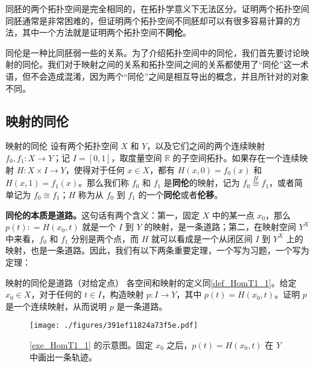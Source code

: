 
同胚的两个拓扑空间是完全相同的，在拓扑学意义下无法区分。证明两个拓扑空间同胚通常是非常困难的，但证明两个拓扑空间不同胚却可以有很多容易计算的方法，其中一个方法就是证明两个拓扑空间不\textbf{同伦}。

同伦是一种比同胚弱一些的关系。为了介绍拓扑空间中的同伦，我们首先要讨论映射的同伦。我们对于映射之间的关系和拓扑空间之间的关系都使用了“同伦”这一术语，但不会造成混淆，因为两个“同伦”之间是相互导出的概念，并且所针对的对象不同。

\subsection{映射的同伦}

\begin{definition}{映射的同伦}\label{def_HomT1_1}
设有两个拓扑空间 $X$ 和 $Y$，以及它们之间的两个连续映射 $f_0, f_1:X\rightarrow Y$；记 $I=[0, 1]$，取度量空间 $\mathbb{R}$ 的子空间拓扑。如果存在一个连续映射 $H: X\times I\rightarrow Y$，使得对于任何 $x\in X$，都有 $H(x, 0)=f_0(x)$ 和 $H(x, 1)=f_1(x)$。那么我们称 $f_0$ 和 $f_1$ 是\textbf{同伦}的映射，记为 $f_0\overset{H}{\cong} f_1$，或者简单记为 $f_0\cong f_1$；$H$ 称为从 $f_0$ 到 $f_1$ 的一个\textbf{同伦}或者\textbf{伦移}。

\end{definition}

\textbf{同伦的本质是道路。}这句话有两个含义：第一，固定 $X$ 中的某一点 $x_0$，那么 $p(t): = H(x_0, t)$ 就是一个 $I$ 到 $Y$ 的映射，是一条道路；第二，在映射空间 $Y^X$ 中来看，$f_0$ 和 $f_1$ 分别是两个点，而 $H$ 就可以看成是一个从闭区间 $I$ 到 $Y^X$ 上的映射，也是一条道路。因此，我们有以下两条重要定理，一个写为习题，一个写为定理：

\begin{exercise}{映射的同伦是道路（对给定点）}\label{exe_HomT1_1}
各空间和映射的定义同\autoref{def_HomT1_1}。给定 $x_0\in X$，对于任何的 $t\in I$，构造映射 $p:I\rightarrow Y$，其中 $p(t)=H(x_0, t)$。证明 $p$ 是一个连续映射，从而说明 $p$ 是一条道路。
\end{exercise}

\begin{figure}[ht]
\centering
\texttt{[image: ./figures/391ef11824a73f5e.pdf]}
\caption{\autoref{exe_HomT1_1} 的示意图。固定 $x_0$ 之后，$p(t)=H(x_0, t)$ 在 $Y$ 中画出一条轨迹。} \label{fig_HomT1_1}
\end{figure}



